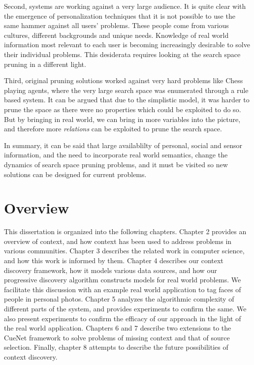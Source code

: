 Second, systems are working against a very large audience. It is quite clear with the emergence of personalization techniques that it is not possible to use the same hammer against all users' problems. These people come from various cultures, different backgrounds and unique needs. Knowledge of real world information most relevant to each user is becoming increasingly desirable to solve their individual problems. This desiderata requires looking at the search space pruning in a different light.

Third, original pruning solutions worked against very hard problems like Chess playing agents, where the very large search space was enumerated through a rule based system. It can be argued that due to the simplistic model, it was harder to prune the space as there were no properties which could be exploited to do so. But by bringing in real world, we can bring in more variables into the picture, and therefore more \textit{relations} can be exploited to prune the search space.

In summary, it can be said that large availablilty of personal, social and sensor information, and the need to incorporate real world semantics, change the dynamics of search space pruning problems, and it must be visited so new solutions can be designed for current problems.

\section{Overview}
This dissertation is organized into the following chapters. Chapter 2 provides an overview of context, and how context has been used to address problems in various communities. Chapter 3 describes the related work in computer science, and how this work is informed by them. Chapter 4 describes our context discovery framework, how it models various data sources, and how our progressive discovery algorithm constructs models for real world problems. We facilitate this discussion with an example real world application to tag faces of people in personal photos. Chapter 5 analyzes the algorithmic complexity of different parts of the system, and provides experiments to confirm the same. We also present experiments to confirm the efficacy of our approach in the light of the real world application. Chapters 6 and 7 describe two extensions to the CueNet framework to solve problems of missing context and that of source selection. Finally, chapter 8 attempts to describe the future possibilities of context discovery.

